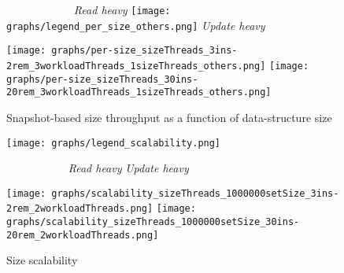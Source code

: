 \documentclass{article}
\begin{document}
\begin{figure*}
  \caption{Snapshot-based size throughput as a function of data-structure size}
  \centering
  \medskip
  \textit{\ \ \ \ \ \ \ \ \ \ \ \ Read heavy}\hfill
  \texttt{[image: graphs/legend\_per\_size\_others.png]}\hfill
  \textit{Update heavy\ \ \ \ }\par
  \medskip
  \texttt{[image: graphs/per-size\_sizeThreads\_3ins-2rem\_3workloadThreads\_1sizeThreads\_others.png]}\hfill
  \texttt{[image: graphs/per-size\_sizeThreads\_30ins-20rem\_3workloadThreads\_1sizeThreads\_others.png]}
  \label{fig:per-size-snapshot}
\end{figure*}

\begin{figure*}[ht]
  \caption{Size scalability}
  \centering
  \medskip
  \hfill\texttt{[image: graphs/legend\_scalability.png]}\hspace*{1.5mm}\par
  \textit{\ \ \ \ \ \ \ \ \ \ \ Read heavy}\hfill
  \textit{Update heavy\ \ \ \ }\par
  \medskip
  \texttt{[image: graphs/scalability\_sizeThreads\_1000000setSize\_3ins-2rem\_2workloadThreads.png]}\hfill
  \texttt{[image: graphs/scalability\_sizeThreads\_1000000setSize\_30ins-20rem\_2workloadThreads.png]}
  \label{fig:scalability}
\end{figure*}
\end{document}

